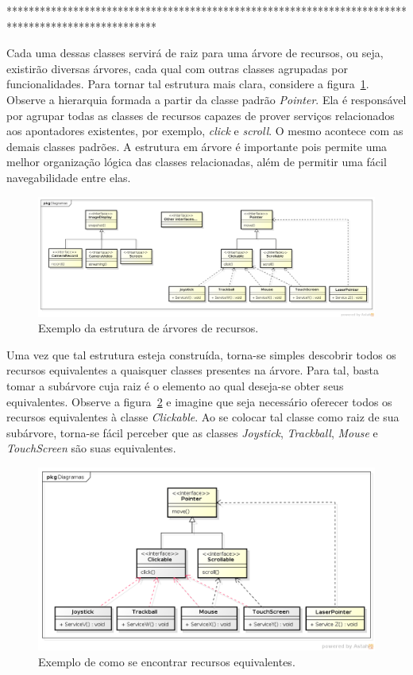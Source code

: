 ***************************************************************************************************



Cada uma dessas classes servirá de raiz para uma árvore de recursos, ou seja, existirão diversas árvores, cada qual com outras classes agrupadas por funcionalidades. Para tornar tal estrutura mais clara, considere a figura~\ref{fig:arvoreDeRecursos}. Observe a hierarquia formada a partir da classe padrão \emph{Pointer}. Ela é responsável por agrupar todas as classes de recursos capazes de prover serviços relacionados aos apontadores existentes, por exemplo, \emph{click} e \emph{scroll}. O mesmo acontece com as demais classes padrões. A estrutura em árvore é importante pois permite uma melhor organização lógica das classes relacionadas, além de permitir uma fácil navegabilidade entre elas.

\begin{figure}[ht]
	\center
	\includegraphics[scale=0.35]{imagens/hierarquiaDeRecursos}
	\caption{Exemplo da estrutura de árvores de recursos.}
	\label{fig:arvoreDeRecursos}
\end{figure}

Uma vez que tal estrutura esteja construída, torna-se simples descobrir todos os recursos equivalentes a quaisquer classes presentes na árvore. Para tal, basta tomar a subárvore cuja raiz é o elemento ao qual deseja-se obter seus equivalentes. Observe a figura~\ref{fig:tutorialDeEquivalencia} e imagine que seja necessário oferecer todos os recursos equivalentes à classe \emph{Clickable}. Ao se colocar tal classe como raiz de sua subárvore, torna-se fácil perceber que as classes \emph{Joystick}, \emph{Trackball}, \emph{Mouse} e \emph{TouchScreen} são suas equivalentes.

\begin{figure}[ht]
	\center
	\includegraphics[scale=0.55]{imagens/tutorialDeEquivalencia}
	\caption{Exemplo de como se encontrar recursos equivalentes.}
	\label{fig:tutorialDeEquivalencia}
\end{figure}


